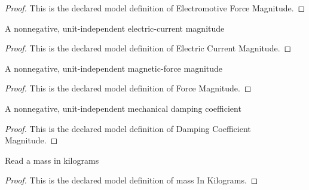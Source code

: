 \begin{proof}
  This is the declared model definition of Electromotive Force Magnitude.
\end{proof}
\begin{definition}
  \label{def:physics:phyx-mini-0979:phyxminiproblems-problemphyxmini0979-electriccurrentmagnitude}
  A nonnegative, unit-independent electric-current magnitude
\end{definition}
\begin{proof}
  This is the declared model definition of Electric Current Magnitude.
\end{proof}
\begin{definition}
  \label{def:physics:phyx-mini-0979:phyxminiproblems-problemphyxmini0979-forcemagnitude}
  A nonnegative, unit-independent magnetic-force magnitude
\end{definition}
\begin{proof}
  This is the declared model definition of Force Magnitude.
\end{proof}
\begin{definition}
  \label{def:physics:phyx-mini-0979:phyxminiproblems-problemphyxmini0979-dampingcoefficientmagnitude}
  A nonnegative, unit-independent mechanical damping coefficient
\end{definition}
\begin{proof}
  This is the declared model definition of Damping Coefficient Magnitude.
\end{proof}
\begin{definition}
  \label{def:physics:phyx-mini-0979:phyxminiproblems-problemphyxmini0979-massinkilograms}
  Read a mass in kilograms
\end{definition}
\begin{proof}
  This is the declared model definition of mass In Kilograms.
\end{proof}
